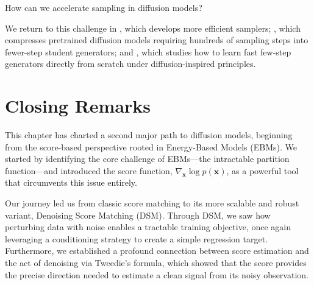 \begin{question}\label{ques:dm-sampling-slow}
    How can we accelerate sampling in diffusion models?
\end{question}

We return to this challenge in , which develops more efficient samplers; , which compresses pretrained diffusion models requiring hundreds of sampling steps into fewer-step student generators; and , which studies how to learn fast few-step generators directly from scratch under diffusion-inspired principles.




\newpage

\section{Closing Remarks}\label{sec:ch3_cr}



This chapter has charted a second major path to diffusion models, beginning from the score-based perspective rooted in Energy-Based Models (EBMs). We started by identifying the core challenge of EBMs—the intractable partition function—and introduced the score function, $\nabla_{\mathbf{x}}\log{p(\mathbf{x})}$, as a powerful tool that circumvents this issue entirely.

Our journey led us from classic score matching to its more scalable and robust variant, Denoising Score Matching (DSM). Through DSM, we saw how perturbing data with noise enables a tractable training objective, once again leveraging a conditioning strategy to create a simple regression target. Furthermore, we established a profound connection between score estimation and the act of denoising via Tweedie's formula, which showed that the score provides the precise direction needed to estimate a clean signal from its noisy observation.



